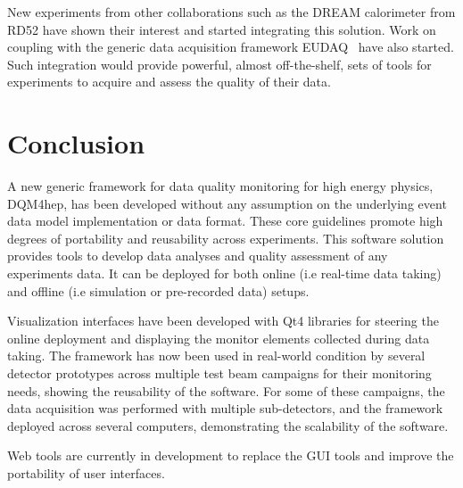\documentclass{webofc}
\begin{document}
New experiments from other collaborations such as the DREAM calorimeter from RD52 have shown their interest and started integrating this solution.
Work on coupling with the generic data acquisition framework EUDAQ~\cite{EUDAQ} have also started.
Such integration would provide powerful, almost off-the-shelf, sets of tools for experiments to acquire and assess the quality of their data.

\section{Conclusion}
\label{sec:conclusion}

A new generic framework for data quality monitoring for high energy physics, DQM4hep, has been developed without any assumption on the underlying event data model implementation or data format.
These core guidelines promote high degrees of portability and reusability across experiments.
This software solution provides tools to develop data analyses and quality assessment of any experiments data.
It can be deployed for both online (i.e real-time data taking) and offline (i.e simulation or pre-recorded data) setups.

Visualization interfaces have been developed with Qt4 libraries for steering the online deployment and displaying the monitor elements collected during data taking.
The framework has now been used in real-world condition by several detector prototypes across multiple test beam campaigns for their monitoring needs, showing the reusability of the software.
For some of these campaigns, the data acquisition was performed with multiple sub-detectors, and the framework deployed across several computers, demonstrating the scalability of the software.

Web tools are currently in development to replace the GUI tools and improve the portability of user interfaces.


\end{document}
